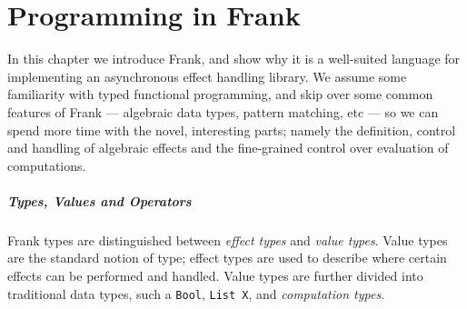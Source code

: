 \documentclass[msc,deptreport,cs]{infthesis} %
\newcommand{\code}[1]{\lstinline{#1}}
\newcommand{\todo}[1]
           {{\par\noindent\small\color{RoyalPurple}
  \framebox{\parbox{\dimexpr\linewidth-2\fboxsep-2\fboxrule}
    {\textbf{TODO:} #1}}}}
\begin{document}
\chapter{Programming in Frank}
\label{chap:programming-in-frank}

In this chapter we introduce Frank, and show why it is a well-suited language
for implementing an asynchronous effect handling library. We assume some
familiarity with typed functional programming, and skip over some common
features of Frank --- algebraic data types, pattern matching, etc --- so we can
spend more time with the novel, interesting parts; namely the definition,
control and handling of algebraic effects and the fine-grained control over
evaluation of computations.






\paragraph*{Types, Values and Operators}

Frank types are distinguished between \emph{effect types} and \emph{value
  types}. Value types are the standard notion of type; effect types are
used to describe where certain effects can be performed and handled. Value types are further divided into traditional data types, such a \code{Bool},
\code{List X}, and \emph{computation types}.
\end{document}
